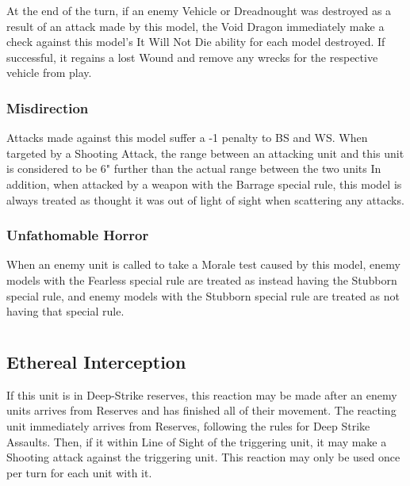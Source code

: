 At the end of the turn, if an enemy Vehicle or Dreadnought was destroyed as a result of an attack made by this model, the Void Dragon immediately make a check against this model's It Will Not Die ability for each model destroyed. If successful, it regains a lost Wound and remove any wrecks for the respective vehicle from play.

\subsubsection{Misdirection} \label{Misdirection}

Attacks made against this model suffer a -1 penalty to BS and WS. When targeted by a Shooting Attack, the range between an attacking unit and this unit is considered to be 6" further than the actual range between the two units In addition, when attacked by a weapon with the Barrage special rule, this model is always treated as thought it was out of light of sight when scattering any attacks.

\subsubsection{Unfathomable Horror} \label{Unfathomable Horror}

When an enemy unit is called to take a Morale test caused by this model, enemy models with the Fearless special rule are treated as instead having the Stubborn special rule, and enemy models with the Stubborn special rule are treated as not having that special rule.

\section[Reactions]{}

\subsection{Ethereal Interception} \label{Ethereal Interception}

If this unit is in Deep-Strike reserves, this reaction may be made after an enemy units arrives from Reserves and has finished all of their movement. The reacting unit immediately arrives from Reserves, following the rules for Deep Strike Assaults. Then, if it within Line of Sight of the triggering unit, it may make a Shooting attack against the triggering unit. This reaction may only be used once per turn for each unit with it. \\

